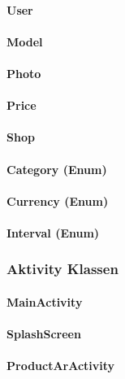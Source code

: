 \documentclass{scrartcl}
\begin{document}
\paragraph{User}

\paragraph{Model}

\paragraph{Photo}

\paragraph{Price}

\paragraph{Shop}

\paragraph{Category (Enum)}

\paragraph{Currency (Enum)}

\paragraph{Interval (Enum)}

\subsubsection{Aktivity Klassen}

\paragraph{MainActivity}

\paragraph{SplashScreen}

\paragraph{ProductArActivity}
\end{document}

